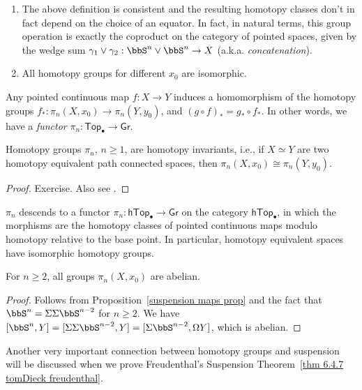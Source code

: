 \begin{xca}
\begin{enumerate}
    \item The above definition is consistent and the resulting homotopy classes don't in fact depend on the choice of an equator. In fact, in natural terms, this group operation is exactly the coproduct on the category of pointed spaces, given by the wedge sum $\gamma_1\lor\gamma_2:\bbS^n\lor \bbS^n\to X$ (a.k.a. \emph{concatenation}).
    \item All homotopy groups for different $x_0$ are isomorphic.
\end{enumerate}
\end{xca}


\begin{prop}[Functoriality of $\pi_n$]
    Any pointed continuous map $f:X\to Y$ induces a homomorphism of the homotopy groups $f_\ast:\pi_n(X,x_0)\to \pi_n(Y,y_0)$, and $(g\circ f)_\ast=g_\ast\circ f_\ast$. In other words, we have a \emph{functor} $\pi_n:\mathsf{Top}_\bullet\to \mathsf{Gr}$.
\end{prop}

\begin{thm}
Homotopy groups $\pi_n$, $n\geq 1$, are homotopy invariants, i.e., if $X\simeq Y$ are two homotopy equivalent path connected spaces, then $\pi_n(X,x_0)\cong\pi_n(Y,y_0)$.
\end{thm}
\begin{proof}
Exercise. Also see \cite{Hatcher}.
\end{proof}
\begin{cor}
    $\pi_n$ descends to a functor $\pi_n:\mathsf{hTop}_\bullet\to \mathsf{Gr}$ on the category $\mathsf{hTop}_\bullet$, in which the morphisms are the homotopy classes of pointed continuous maps modulo homotopy relative to the base point. In particular, homotopy equivalent spaces have isomorphic homotopy groups.
\end{cor}

\begin{thm}
For $n\geq 2$, all groups $\pi_n(X,x_0)$ are abelian.
\end{thm}
\begin{proof}
Follows from Proposition~\ref{suspension maps prop} and the fact that $\bbS^n=\Sigma\Sigma \bbS^{n-2}$ for $n\geq 2$. We have $[\bbS^n,Y]=[\Sigma\Sigma \bbS^{n-2},Y]=[\Sigma \bbS^{n-2}, \Omega Y]$, which is abelian.
\end{proof}

Another very important connection between homotopy groups and suspension will be discussed when we prove Freudenthal's Suspension Theorem~\ref{thm 6.4.7 tomDieck freudenthal}.



